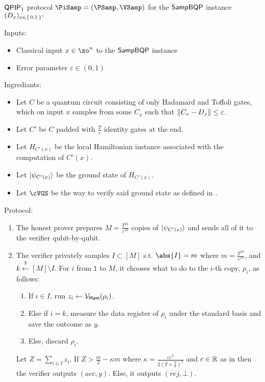 \begin{protocol}{$\operatorname{\mathsf{QPIP}}_1$ protocol $\PiSamp=(\PSamp, \VSamp)$ for the $\operatorname{\mathsf{SampBQP}}$ instance $(D_x)_{x\in\set{0, 1}^*}$}
	\label{ProtoQPIP1}

	Inputs: 
	\begin{itemize}
		\item Classical input $x\in\zo^n$ to the $\operatorname{\mathsf{SampBQP}}$ instance
		\item Error parameter $\varepsilon\in(0, 1)$
	\end{itemize}

	Ingrediants:
	\begin{itemize}
		\item Let $C$ be a quantum circuit consisting of only Hadamard and Toffoli gates, which on input $x$ samples from some $C_x$ such that $\left\lVert C_x-D_x\right\rVert\leq\varepsilon$.
		\item Let $C'$ be $C$ padded with $\frac{T}{\varepsilon}$ identity gates at the end.
		\item Let $H_{C'(x)}$ be the local Hamiltonian instance associated with the computation of $C'(x)$.
		\item Let $\ket{\psi_{C'(x)}}$ be the ground state of $H_{C'(x)}$.
		\item Let $\cVGS$ be the way to verify said ground state as defined in . 
	\end{itemize}

	Protocol:
	\begin{enumerate}
		\item The honest prover prepares $M=\frac{T^{21}}{\varepsilon^{33}}$ copies of $\ket{\psi_{C'(x)}}$ and sends all of it to the verifier qubit-by-qubit.
		\item The verifier privately samples $I\subset[M]$ s.t. $\abs{I}=m$ where $m=\frac{T^{10}}{\varepsilon^{15}}$, and $k\xleftarrow{\$}[M]\setminus I$.
			For $i$ from $1$ to $M$, it chooses what to do to the $i$-th copy, $\rho_i$, as follows:
		\begin{enumerate}
			\item If $i\in I$, run $z_i\leftarrow\mathcal{V}_{\mathsf{Ham}}(\rho_i)$.
			\item Else if $i=k$, measure the data register  of $\rho_i$ under the standard basis and save the outcome as $y$.
			\item Else, discard $\rho_i$.
		\end{enumerate}
			Let $Z=\sum_{i\in I} z_i$. If $Z>\frac{m}{2}-\kappa m$ where $\kappa=\frac{c\varepsilon^2}{2\left(T+\frac{T}{\varepsilon}\right)^5}$ and $c\in\mathbb{R}$ as in  then the verifier outputs $(acc, y)$. Else, it outputs $(rej, \bot)$.
	\end{enumerate}
\end{protocol}

